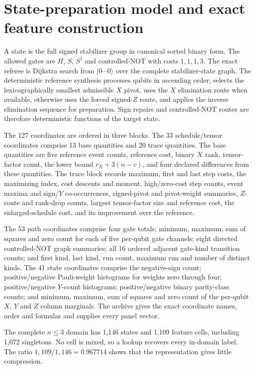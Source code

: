 \documentclass[a4paper,onecolumn,11pt,unpublished,noarxiv]{quantumarticle}
\begin{document}
\SixShapeTable
\FloatBarrier

\section{State-preparation model and exact feature construction}\label{sec:state-protocol}

A state is the full signed stabilizer group in canonical sorted binary form.  The allowed gates are $H$, $S$, $S^\dagger$ and controlled-NOT with costs $1,1,1,3$.  The exact referee is Dijkstra search from $|0\cdots0\rangle$ over the complete stabilizer-state graph.  The deterministic reference synthesis processes qubits in ascending order, selects the lexicographically smallest admissible $X$ pivot, uses the $X$ elimination route when available, otherwise uses the forced signed-$Z$ route, and applies the inverse elimination sequence for preparation.  Sign repairs and controlled-NOT routes are therefore deterministic functions of the target state.

The 127 coordinates are ordered in three blocks.  The 33 schedule/tensor coordinates comprise 13 base quantities and 20 trace quantities.  The base quantities are five reference event counts, reference cost, binary $X$ rank, tensor-factor count, the lower bound $r_X+3(n-c)$, and four declared differences from these quantities.  The trace block records maximum, first and last step costs, the maximizing index, cost descents and moment, high/zero-cost step counts, event maxima and sign/$Y$ co-occurrences, signed-pivot and pivot-weight summaries, $Z$-route and rank-drop counts, largest tensor-factor size and reference cost, the enlarged-schedule cost, and its improvement over the reference.

The 53 path coordinates comprise four gate totals; minimum, maximum, sum of squares and zero count for each of five per-qubit gate channels; eight directed controlled-NOT graph summaries; all 16 ordered adjacent gate-kind transition counts; and first kind, last kind, run count, maximum run and number of distinct kinds.  The 41 state coordinates comprise the negative-sign count; positive/negative Pauli-weight histograms for weights zero through four; positive/negative $Y$-count histograms; positive/negative binary parity-class counts; and minimum, maximum, sum of squares and zero count of the per-qubit $X$, $Y$ and $Z$ column marginals.  The archive gives the exact coordinate names, order and formulas and supplies every panel vector.

The complete $n\le3$ domain has 1,146 states and 1,109 feature cells, including 1,072 singletons.  No cell is mixed, so a lookup recovers every in-domain label.  The ratio $1{,}109/1{,}146=0.967714$ shows that the representation gives little compression.
\end{document}
